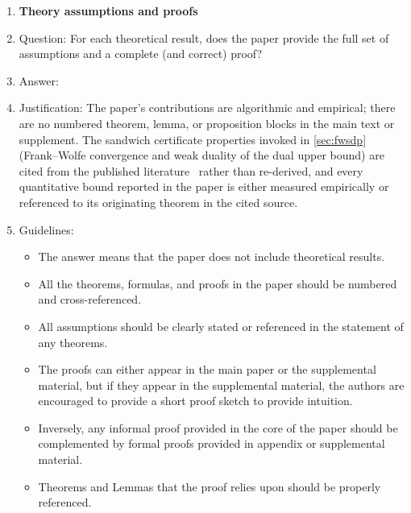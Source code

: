\begin{enumerate}
\begin{itemize}
        \item The authors should discuss the computational efficiency of the proposed algorithms and how they scale with dataset size.
        \item If applicable, the authors should discuss possible limitations of their approach to address problems of privacy and fairness.
        \item While the authors might fear that complete honesty about limitations might be used by reviewers as grounds for rejection, a worse outcome might be that reviewers discover limitations that aren't acknowledged in the paper. The authors should use their best judgment and recognize that individual actions in favor of transparency play an important role in developing norms that preserve the integrity of the community. Reviewers will be specifically instructed to not penalize honesty concerning limitations.
    \end{itemize}

\item {\bf Theory assumptions and proofs}
    \item[] Question: For each theoretical result, does the paper provide the full set of assumptions and a complete (and correct) proof?
    \item[] Answer: \answerNA{} %
    \item[] Justification: The paper's contributions are algorithmic and
        empirical; there are no numbered theorem, lemma, or proposition
        blocks in the main text or supplement. The sandwich certificate
        properties invoked in \cref{sec:fwsdp} (Frank--Wolfe convergence
        and weak duality of the dual upper bound) are cited from the
        published
        literature~\cite{jaggi2013revisiting,hazan2008sparse,yurtsever2021scalable}
        rather than re-derived, and every quantitative bound reported in
        the paper is either measured empirically or referenced to its
        originating theorem in the cited source.
    \item[] Guidelines:
    \begin{itemize}
        \item The answer \answerNA{} means that the paper does not include theoretical results.
        \item All the theorems, formulas, and proofs in the paper should be numbered and cross-referenced.
        \item All assumptions should be clearly stated or referenced in the statement of any theorems.
        \item The proofs can either appear in the main paper or the supplemental material, but if they appear in the supplemental material, the authors are encouraged to provide a short proof sketch to provide intuition.
        \item Inversely, any informal proof provided in the core of the paper should be complemented by formal proofs provided in appendix or supplemental material.
        \item Theorems and Lemmas that the proof relies upon should be properly referenced.
    \end{itemize}


\end{enumerate}

